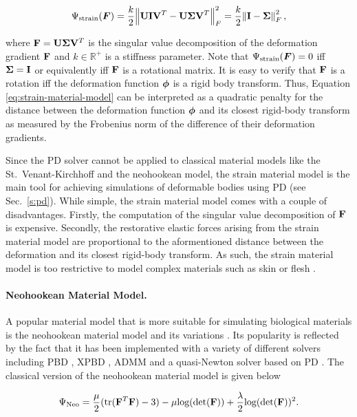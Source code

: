 \begin{equation}\label{eq:strain-material-model}
    \Psi_{\text{strain}}(\bm{F}) = \frac{k}{2} \norm{\mathbf{U}\mathbf{I}\mathbf{V}^T - \mathbf{U}\mathbf{\Sigma}\mathbf{V}^T}^2_F 
    = \frac{k}{2} \norm{\mathbf{I} - \mathbf{\Sigma}}^2_F,
\end{equation}

\noindent where $\mathbf{F} = \mathbf{U}\mathbf{\Sigma}\mathbf{V}^T$ is the singular value decomposition of the deformation gradient $\mathbf{F}$ and $k 
\in \mathbb{R}^+$ is a stiffness parameter. Note that $\Psi_{\text{strain}}(\bm{F}) = 0$ iff $\mathbf{\Sigma} = \mathbf{I}$ or equivalently iff 
$\mathbf{F}$ is a rotational matrix. It is easy to verify that $\mathbf{F}$ is a rotation iff the deformation function $\bm{\phi}$ is a rigid body 
transform. Thus, Equation \ref{eq:strain-material-model} can be interpreted as a quadratic penalty for the distance between the 
deformation function $\bm{\phi}$ and its closest rigid-body transform as measured by the Frobenius norm of the difference of their deformation 
gradients. 

Since the PD solver cannot be applied to classical material models like the St.\ Venant-Kirchhoff and the neohookean model, the strain 
material model is the main tool for achieving simulations of deformable bodies using PD (see Sec.\ \ref{s:pd}).
While simple, the strain material model comes with a couple of disadvantages. Firstly, the computation of the singular value decomposition of 
$\mathbf{F}$ is expensive. Secondly, the restorative elastic forces arising from the strain material model are proportional 
to the aformentioned distance between the deformation and its closest rigid-body transform. As such, the strain material model is too 
restrictive to model complex materials such as skin or flesh \cite{liu2017}. 

\paragraph{Neohookean Material Model.}
A popular material model that is more suitable for simulating biological materials is the neohookean material model and its variations 
\cite{smith2018}. Its popularity is reflected by the fact that it has been implemented with a variety of different solvers including 
PBD \cite{bender2014}, XPBD \cite{macklin2021}, ADMM \cite{overby2017} and a quasi-Newton solver based on PD \cite{liu2017}.
The classical version of the neohookean material model is given below

\begin{equation}\label{eq:neohookean-material-model}
    \Psi_{\text{Neo}} = \frac{\mu}{2}(\text{tr}(\mathbf{F}^T\mathbf{F}) - 3) - \mu \text{log}(\text{det}(\mathbf{F})) 
    + \frac{\lambda}{2}\text{log}(\text{det}(\mathbf{F}))^2.
\end{equation}

